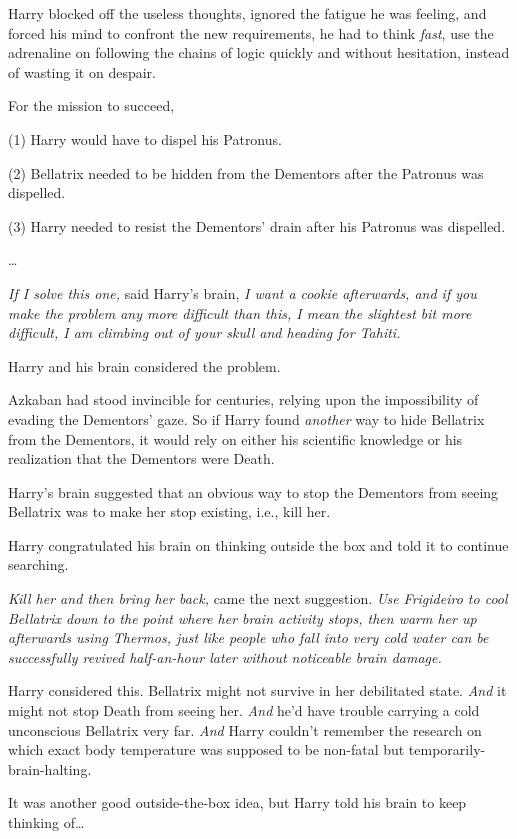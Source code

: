 Harry blocked off the useless thoughts, ignored the fatigue he was feeling, and forced his mind to confront the new requirements, he had to think \emph{fast}, use the adrenaline on following the chains of logic quickly and without hesitation, instead of wasting it on despair.

For the mission to succeed,

(1) Harry would have to dispel his Patronus.

(2) Bellatrix needed to be hidden from the Dementors after the Patronus was dispelled.

(3) Harry needed to resist the Dementors' drain after his Patronus was dispelled.

{\ldots}

\emph{If I solve this one,} said Harry's brain, \emph{I want a cookie afterwards, and if you make the problem any more difficult than this, I mean the slightest bit more difficult, I am climbing out of your skull and heading for Tahiti.}

Harry and his brain considered the problem.

Azkaban had stood invincible for centuries, relying upon the impossibility of evading the Dementors' gaze. So if Harry found \emph{another} way to hide Bellatrix from the Dementors, it would rely on either his scientific knowledge or his realization that the Dementors were Death.

Harry's brain suggested that an obvious way to stop the Dementors from seeing Bellatrix was to make her stop existing, i.e., kill her.

Harry congratulated his brain on thinking outside the box and told it to continue searching.

\emph{Kill her and then bring her back,} came the next suggestion. \emph{Use Frigideiro to cool Bellatrix down to the point where her brain activity stops, then warm her up afterwards using Thermos, just like people who fall into very cold water can be successfully revived half-an-hour later without noticeable brain damage.}

Harry considered this. Bellatrix might not survive in her debilitated state. \emph{And} it might not stop Death from seeing her. \emph{And} he'd have trouble carrying a cold unconscious Bellatrix very far. \emph{And} Harry couldn't remember the research on which exact body temperature was supposed to be non-fatal but temporarily-brain-halting.

It was another good outside-the-box idea, but Harry told his brain to keep thinking of{\ldots}

